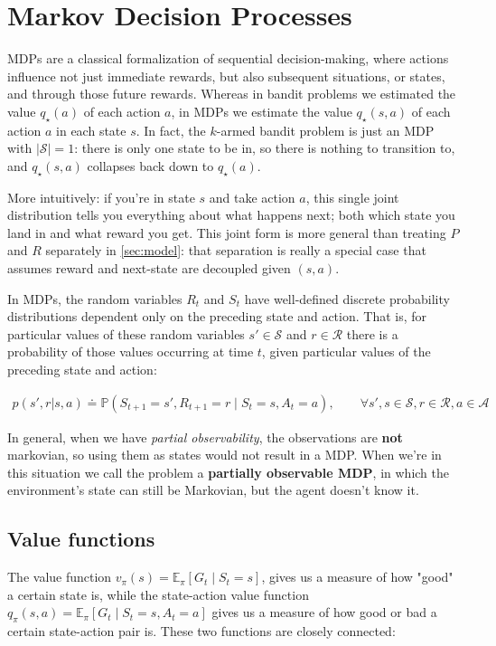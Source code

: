 \section{Markov Decision Processes}
MDPs are a classical formalization of sequential decision-making, where actions influence not just immediate rewards, but also subsequent situations, or states, and through those future rewards. Whereas in bandit problems we estimated the value $q_\star(a)$ of each action $a$, in MDPs we estimate the value $q_\star(s,a)$ of each action $a$ in each state $s$. In fact, the $k$-armed bandit problem is just an MDP with $\lvert\mathcal{S}\rvert = 1$: there is
only one state to be in, so there is nothing to transition to, and $q_\star(s,a)$ collapses back down to $q_\star(a)$.

More intuitively: if you're in state $s$ and take action $a$, this single joint distribution tells you everything about what happens next; both which state you land in and what reward you get. This joint form is more general than treating $P$ and $R$ separately in \ref{sec:model}: that separation is really a special case that assumes reward and next-state are decoupled given $(s,a)$.

In MDPs, the random variables $R_t$ and $S_t$ have well-defined discrete probability distributions dependent only on the preceding state and action. That is, for particular values of these random variables $s' \in \mathcal{S}$ and $r \in \mathcal{R}$ there is a probability of those values occurring at time $t$, given particular values of the preceding state and action:

\begin{align*}
        p(s', r | s, a) \doteq \mathbb{P}(S_{t+1}=s', R_{t+1} = r \mid S_{t} = s, A_{t} = a), \qquad \forall s', s \in \mathcal{S}, r \in \mathcal{R}, a \in \mathcal{A}
\end{align*}

In general, when we have \textit{partial observability}, the observations are \textbf{not} markovian, so using them as states would not result in a MDP. When we're in this situation we call the problem a \textbf{partially observable MDP}, in which the environment's state can still be Markovian, but the agent doesn't know it.

\subsection{Value functions}
The value function $v_\pi(s) = \mathbb{E}_\pi[G_t \mid S_t=s]$, gives us a measure of how "good" a certain state is, while the state-action value function $q_\pi(s,a) = \mathbb{E}_\pi[G_t \mid S_t=s, A_t=a]$ gives us a measure of how good or bad a certain state-action pair is. These two functions are closely connected:

